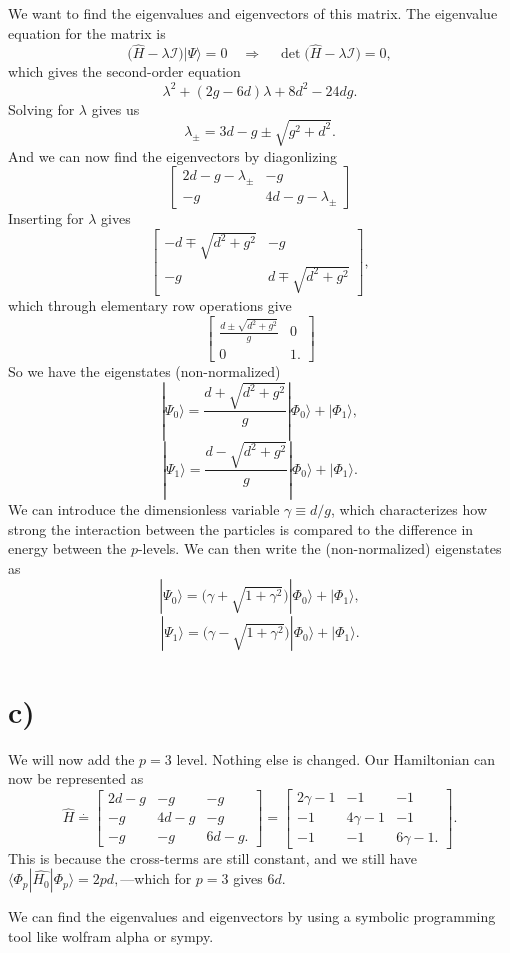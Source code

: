 \documentclass[a4paper, 11pt, notitlepage, english]{article}
\newcommand{\ket}[1]{|#1 \rangle}
\newcommand{\op}[1]{\hat{#1}}
\newcommand{\braopket}[3]{\langle #1 | {#2} | #3 \rangle}
\newcommand{\To}{\quad\Rightarrow\quad}
\newcommand{\I}{\boldsymbol{\mathcal{I}}}
\begin{document}
We want to find the eigenvalues and eigenvectors of this matrix. The eigenvalue equation for the matrix is
$$\big(\op{H} - \lambda\I)\ket{\Psi} = 0 \To \det \big(\op{H} - \lambda\I) = 0,$$
which gives the second-order equation
$$\lambda^2 + (2g-6d)\lambda + 8d^2 - 24dg.$$
Solving for $\lambda$ gives us
$$\lambda_\pm = 3d -g \pm \sqrt{g^2 + d^2}.$$
And we can now find the eigenvectors by diagonlizing
$$
\begin{bmatrix}
2d - g - \lambda_\pm & -g \\
-g & 4d-g -\lambda_\pm
\end{bmatrix}
$$
Inserting for $\lambda$ gives
$$\begin{bmatrix}
-d \mp \sqrt{d^2 + g^2} & -g \\
-g & d \mp \sqrt{d^2 + g^2}
\end{bmatrix},$$
which through elementary row operations give
$$
\begin{bmatrix}
\frac{d\pm\sqrt{d^2 + g^2}}{g} & 0 \\
0 & 1.
\end{bmatrix}$$
So we have the eigenstates (non-normalized)
$$\ket{\Psi_0} = \frac{d + \sqrt{d^2 + g^2}}{g} \ket{\Phi_0} + \ket{\Phi_1},$$
$$\ket{\Psi_1} = \frac{d - \sqrt{d^2 + g^2}}{g} \ket{\Phi_0} + \ket{\Phi_1}.$$
We can introduce the dimensionless variable $\gamma \equiv d/g$, which characterizes how strong the interaction between the particles is compared to the difference in energy between the $p$-levels. We can then write the (non-normalized) eigenstates as 
$$\ket{\Psi_0} = \big(\gamma + \sqrt{1 + \gamma^2}\big) \ket{\Phi_0} + \ket{\Phi_1},$$
$$\ket{\Psi_1} = \big(\gamma - \sqrt{1 + \gamma^2}\big) \ket{\Phi_0} + \ket{\Phi_1}.$$

\section*{c)}
We will now add the $p=3$ level. Nothing else is changed. Our Hamiltonian can now be represented as
$$\op{H} \overset{\cdot}{=} \begin{bmatrix}
2d -g & -g & -g \\
-g & 4d -g & -g \\
-g & -g & 6d - g.
\end{bmatrix} {=} \begin{bmatrix}
2\gamma -1 & -1 & -1 \\
-1 & 4\gamma -1 & -1 \\
-1 & -1 & 6\gamma - 1.
\end{bmatrix}.$$
This is because the cross-terms are still constant, and we still have $\braopket{\Phi_p}{\op{H_0}}{\Phi_p} = 2pd,$---which for $p=3$ gives $6d$.

We can find the eigenvalues and eigenvectors by using a symbolic programming tool like wolfram alpha or sympy. 
\end{document}

